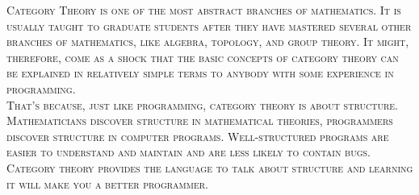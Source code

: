 
{
\fontsize{14}{17}\selectfont
\scshape{Category Theory}\normalfont\sffamily{}
is one of the most abstract branches of mathematics. It is usually taught to
graduate students after they have mastered several other branches of mathematics,
like algebra, topology, and group theory. It might, therefore, come as a shock that
the basic concepts of category theory can be explained in relatively simple terms
to anybody with some experience in programming. \\

That's because, just like programming,
category theory is about structure. Mathematicians discover structure in mathematical
theories, programmers discover structure in computer programs. Well-structured programs
are easier to understand and maintain and are less likely to contain bugs. Category theory
provides the language to talk about structure and learning it will make you
a better programmer.
\vfil

}
